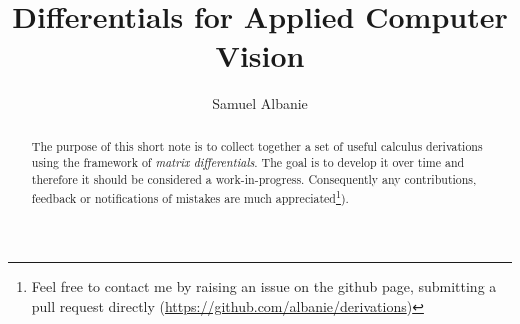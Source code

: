 \documentclass[11pt,openany]{memoir}
\title{Differentials for Applied Computer Vision}
\author{
Samuel Albanie
}
\date{}
\begin{document}


\frontmatter
\maketitle{}

\begin{abstract}
The purpose of this short note is to collect together a set of useful
calculus derivations using the framework of \textit{matrix differentials}. The goal is to develop it over time and therefore it should be considered a work-in-progress.  Consequently any contributions, feedback or notifications of mistakes are much appreciated\footnote{Feel free to contact me by raising an issue on the github page, submitting a pull request directly (\mbox{\url{https://github.com/albanie/derivations})}}).
\end{abstract}
\clearpage

\tableofcontents*
\clearpage

\mainmatter








\end{document}
